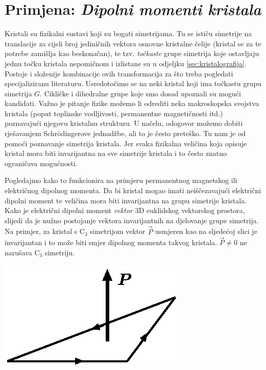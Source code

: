 \section{Primjena: \emph{Dipolni momenti kristala}}

Kristali su fizikalni sustavi koji su bogati simetrijama. Tu se
ističu simetrije na translacije za cijeli broj jediničnih vektora
osnovne kristalne čelije (kristal se za te potrebe zamišlja kao beskonačan),
te tzv. \emph{točkaste} grupe simetrija koje ostavljaju jednu točku
kristala nepomičnom i izlistane su u odjeljku \ref{sec:kristalografija}.
Postoje i složenije kombinacije ovih transformacija za što treba pogledati
specijaliziranu literaturu. Usredotočimo se na neki kristal koji
ima točkastu grupu simetrija $G$. Cikličke i dihedralne grupe koje smo
dosad upoznali su mogući kandidati. Važno je pitanje fizike možemo li odrediti
neka makroskopska svojstva kristala (poput toplinske vodljivosti,
permanentne magnetičnosti itd.) poznavajući njegovu kristalnu strukturu.
U načelu, odogovor možemo dobiti rješavanjem Schr\"{o}dingerove jednadžbe,
ali to je često preteško. Tu nam je od pomoći poznavanje simetrija
kristala. Jer svaka fizikalna veličina koja opisuje kristal mora
biti invarijantna na sve simetrije kristala i to često znatno
ograničava mogućnosti.

Pogledajmo kako to funkcionira na primjeru
permanentnog magnetskog ili električnog dipolnog
momenta. Da bi kristal mogao imati neiščezavajući
električni dipolni moment
te veličina mora biti invarijantna na grupu simetrije
kristala.
Kako je električni dipolni moment \emph{vektor} 3D euklidskog vektorskog prostora,
slijedi da je nužno postojanje vektora invarijantnih na djelovanje grupe simetrija.
Na primjer, za kristal s C$_3$ simetrijom vektor $\vec{P}$ usmjeren
kao na sljedećoj slici je invarijantan i
to može biti smjer dipolnog momenta takvog kristala. $\vec{P}\neq 0$
ne narušava C$_3$ simetriju.

\centerline{\includegraphics[scale=1.0]{pics/dipol.eps}}

